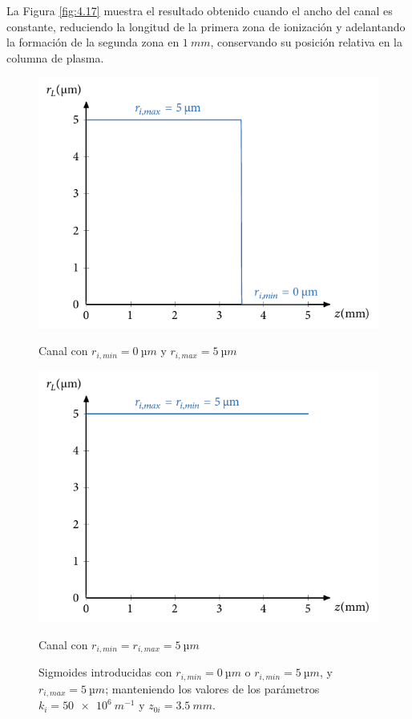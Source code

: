 La Figura \ref{fig:4.17} muestra el resultado obtenido cuando el ancho del canal es constante, reduciendo la longitud de la primera zona de ionización y adelantando la formación de la segunda zona en $\qty{1}{mm}$, conservando su posición relativa en la columna de plasma. 

\begin{figure}[htbp]
  \centering
  \begin{subcaptionblock}{.4\textwidth}
    \centering
    \includegraphics[width=\textwidth]{Figuras/ch4_sigm1_zs.pdf}
    \caption{Canal con $r_{i,min}=\qty{0}{µm}$ y $r_{i,max}=\qty{5}{µm}$}\label{fig:ch4_sigm1_zs}
  \end{subcaptionblock}
  \begin{subcaptionblock}{.4\textwidth}
    \centering
    \includegraphics[width=\textwidth]{Figuras/ch4_sigm2_zs.pdf}
    \caption{Canal con $r_{i,min}=r_{i,max}=\qty{5}{µm}$}\label{fig:ch4_sigm2_zs}
  \end{subcaptionblock}
  \caption{Sigmoides introducidas con $r_{i,min}=\qty{0}{µm}$ o $r_{i,min}=\qty{5}{µm}$, y $r_{i,max}=\qty{5}{µm}$; manteniendo los valores de los parámetros $k_{i}=\qty{50e6}{m^{-1}}$ y $z_{0i}=\qty{3.5}{mm}$.}
   \label{fig:4.16}
\end{figure}


